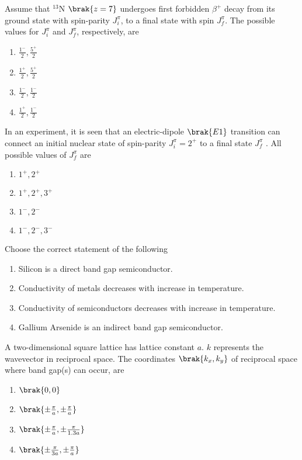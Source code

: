 \begin{enumerate}
\begin{figure}[H]
\label{fig:my_label}
\end{figure}
    \end{enumerate}

    \item Assume that  $^{13}\text{N}$ $\brak{z=7}$ undergoes first forbidden $\beta^{+}$ decay from its ground state with spin-parity $J^{\pi}_i$, to a final state with spin $J^{\pi}_f$. The possible values for $J^{\pi}_i$ and $J^{\pi}_f$, respectively, are
    \begin{enumerate}
        \item $\frac{1^{-}}{2} , \frac{5^{+}}{2}$
        \item $\frac{1^{+}}{2} , \frac{5^{+}}{2}$
        \item $\frac{1^{-}}{2} , \frac{1^{-}}{2}$
        \item $\frac{1^{+}}{2} , \frac{1^{-}}{2}$
    \end{enumerate}

    \item In an experiment, it is seen that an electric-dipole $\brak{E1}$ transition can connect an initial nuclear state of spin-parity $J^{\pi}_i = 2^{+}$ to a final state $J^{\pi}_f$ . All possible values of $J^{\pi}_f$  are
    \begin{enumerate}
        \item $1^{+} , 2^{+}$
        \item $1^{+} , 2^{+} , 3^{+}$
        \item $1^{-} , 2^{-}$
        \item $1^{-} , 2^{-} , 3^{-}$
    \end{enumerate}

    \item Choose the correct statement of the following
    \begin{enumerate}
        \item Silicon is a direct band gap semiconductor.
        \item Conductivity of metals decreases with increase in temperature.
        \item Conductivity of semiconductors decreases with increase in temperature.
        \item Gallium Arsenide is an indirect band gap semiconductor.
    \end{enumerate}

    \item A two-dimensional square lattice has lattice constant $a$. $k$ represents the wavevector in reciprocal space. The coordinates $\brak{k_x, k_y}$ of reciprocal space where band gap(s) can occur, are
    \begin{enumerate}
        \item $\brak{0,0}$
        \item $\brak{\pm \frac{\pi}{a} , \pm \frac{\pi}{a}}$
        \item $\brak{\pm \frac{\pi}{a} , \pm \frac{\pi}{1.3a}}$
        \item $\brak{\pm \frac{\pi}{3a} , \pm \frac{\pi}{a}}$
    \end{enumerate}

